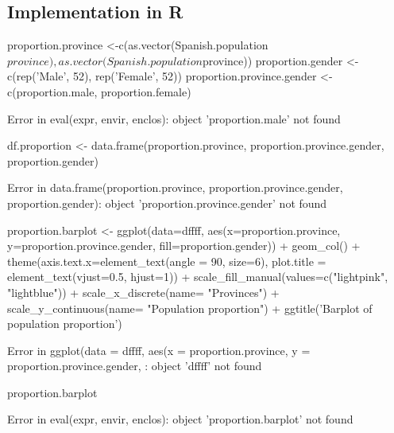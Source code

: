 \documentclass[12pt, oneside]{report}\usepackage[]{graphicx}\usepackage[]{color}
\begin{document}
\subsection*{Implementation in R}
\begin{Schunk}
\begin{Sinput}
proportion.province <-c(as.vector(Spanish.population$province), as.vector(Spanish.population$province))
proportion.gender <- c(rep('Male', 52), rep('Female', 52))
proportion.province.gender <- c(proportion.male, proportion.female)
\end{Sinput}
\begin{Soutput}
Error in eval(expr, envir, enclos): object 'proportion.male' not found
\end{Soutput}
\begin{Sinput}
df.proportion <- data.frame(proportion.province, proportion.province.gender, proportion.gender)
\end{Sinput}
\begin{Soutput}
Error in data.frame(proportion.province, proportion.province.gender, proportion.gender): object 'proportion.province.gender' not found
\end{Soutput}
\begin{Sinput}
proportion.barplot <- ggplot(data=dffff, aes(x=proportion.province, y=proportion.province.gender, fill=proportion.gender)) + 
          geom_col() + 
          theme(axis.text.x=element_text(angle = 90, size=6), plot.title = element_text(vjust=0.5, hjust=1)) +
          scale_fill_manual(values=c("lightpink", "lightblue")) +
          scale_x_discrete(name= "Provinces") +
          scale_y_continuous(name= "Population proportion") + 
          ggtitle('Barplot of population proportion')
\end{Sinput}
\begin{Soutput}
Error in ggplot(data = dffff, aes(x = proportion.province, y = proportion.province.gender, : object 'dffff' not found
\end{Soutput}
\begin{Sinput}
proportion.barplot
\end{Sinput}
\begin{Soutput}
Error in eval(expr, envir, enclos): object 'proportion.barplot' not found
\end{Soutput}
\end{Schunk}
\end{document}
